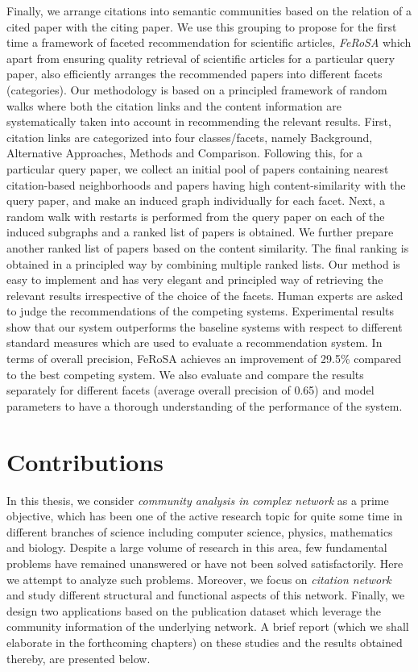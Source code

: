 Finally, we arrange citations into semantic communities based on the relation of a cited paper with the citing paper. We use this grouping
to propose for the first time a framework of faceted recommendation for scientific articles, {\em FeRoSA} which apart from ensuring
quality retrieval of scientific articles for a particular query paper, also efficiently arranges the recommended papers into different
facets (categories).  Our methodology is based on a principled framework of random walks where both the citation links and the content
information are systematically taken into account in recommending the relevant results. First, citation links are categorized into four
classes/facets, namely Background, Alternative Approaches, Methods and Comparison. Following this, for a particular query paper, we collect
an initial pool of papers containing nearest citation-based neighborhoods and papers having high content-similarity with the query paper,
and make an induced graph individually for each facet. Next, a random walk with restarts is performed from the query paper on each of the
induced subgraphs and a  ranked list of papers is obtained. We further prepare another ranked list of papers based on the content
similarity. The final ranking is obtained in a principled way by combining multiple ranked lists.  Our method is easy to implement and has
very elegant and principled way of retrieving the relevant results irrespective of the choice of the facets. Human experts are asked to
judge the recommendations of the competing systems. Experimental results show that our system outperforms the baseline systems with respect
to different standard measures which are used to evaluate a recommendation system. In terms of overall precision, FeRoSA achieves an
improvement of 29.5\% compared to the best competing system. We also evaluate and compare the results separately for different facets
(average
overall precision of 0.65) and model parameters to have a thorough understanding of the
performance of the system.


\section{Contributions}
In this thesis, we consider {\em community analysis in complex network} as a prime objective, which has been one of the active research
topic  for quite some time in different branches of science including computer science, physics, mathematics and
biology. Despite a large
volume of research in this area, few fundamental problems have remained unanswered or have not been solved satisfactorily.
Here we attempt to analyze such problems. Moreover, we focus on {\em citation
network} and study different structural and functional aspects of this network. Finally, we design two applications based on the
publication dataset which leverage the community information of the underlying network. A brief report (which we shall elaborate in
the forthcoming chapters) on these studies and the results obtained thereby, are presented below. 

